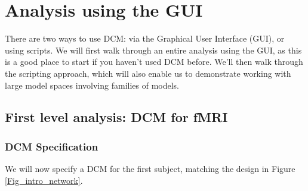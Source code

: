 \documentclass{article}
\begin{document}
\section{Analysis using the GUI}
There are two ways to use DCM: via the Graphical User Interface (GUI), or using scripts. We will first walk through an entire analysis using the GUI, as this is a good place to start if you haven't used DCM before. We'll then walk through the scripting approach, which will also enable us to demonstrate working with large model spaces involving families of models.

\subsection{First level analysis: DCM for fMRI}
\subsubsection{DCM Specification} \label{GUI_specification}
We will now specify a DCM for the first subject, matching the design in Figure \ref{Fig_intro_network}.
\end{document}
